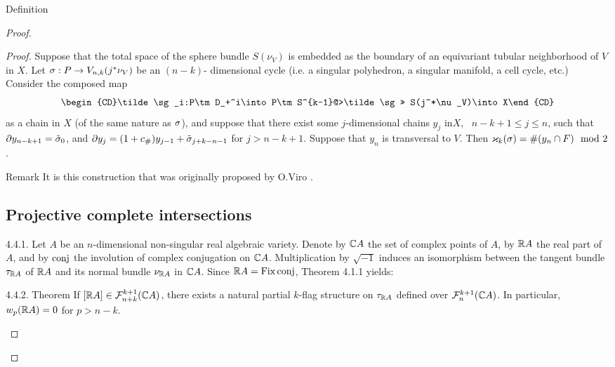 \documentclass{article}
\begin{document}
\begin{subsubsection}{ Definition}
\begin{proof}
{\begin{proof}
{Suppose that the total space of the sphere bundle $S(\nu_V)$ is embedded as
the boundary of an equivariant tubular neighborhood of $V$ in $X$.
Let $\sigma:P\to V_{n,k}(j^*\nu_V)$ be an $(n-k)$- dimensional cycle (i.e. a
singular polyhedron, a singular manifold, a cell cycle, etc.) Consider the
composed map 
$$\begin{CD}\tilde\sg_i:P\tm D_+^i\into P\tm S^{k-1}@>\tilde\sg>>
S(j^*\nu_V)\into X\end{CD} $$ 
as a chain in $X$ (of the same nature as $\sigma$), and
suppose that there exist some $j$-dimensional chains $y_j$ in$X$, \
$n-k+1\le j\le n$, such that $\partial y_{n-k+1}=\tilde{\sigma}_0$, and
$\partial y_j=(1+c_\#)y_{j-1}+\tilde{\sigma}_{j+k-n-1}$ for $j>n-k+1$. Suppose that
$y_n$ is transversal to $V$. Then $\varkappa_k(\sigma)=\#(y_n\cap F)\mod2$.
\begin{remark}{{Remark} It is this construction that
was originally proposed by O.Viro \cite{8}.
}\end{remark}
\subsection{Projective complete intersections
}

4.4.1. Let $A$ be an $n$-dimensional non-singular real algebraic variety.
Denote by $\mathbb C A$ the set of complex points of $A$, by $\mathbb R A$ the real part of
$A$, and by $\operatorname{conj}$ the involution of complex conjugation on $\mathbb C A$.
Multiplication by $\sqrt{-1}$ induces an isomorphism between the tangent
bundle $\tau_{\mathbb R A}$ of $\mathbb R A$ and its normal bundle $\nu_{\mathbb R A}$ in $\mathbb C A$.
Since $\mathbb R A=\operatorname{Fix}\operatorname{conj}$, Theorem 4.1.1 yields:
\begin{proclaim}{{4.4.2. Theorem} If $[\mathbb R A]\in\mathcal F_{n+k}^{k+1}(\mathbb C A)$, there exists a
natural partial $k$-flag structure on $\tau_{\mathbb R A}$ defined over
$\mathcal F_n^{k+1}(\mathbb C A)$. In particular, $w_p(\mathbb R A)=0$ for $p>n-k$.
}\end{proclaim}

}
\end{proof}}
\end{proof}
\end{subsubsection}
\end{document}

